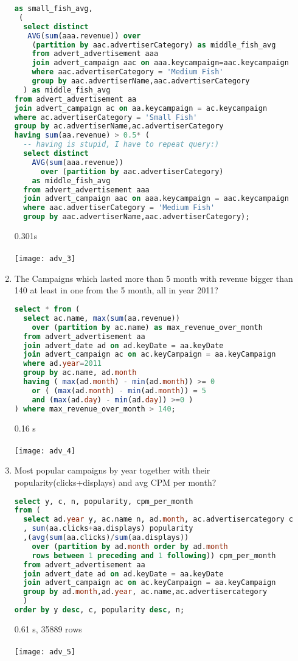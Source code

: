 \begin{enumerate}
\begin{lstlisting}[language=sql]
 as small_fish_avg,
 ( 
  select distinct
   AVG(sum(aaa.revenue)) over 
    (partition by aac.advertiserCategory) as middle_fish_avg
    from advert_advertisement aaa 
    join advert_campaign aac on aaa.keycampaign=aac.keycampaign
    where aac.advertiserCategory = 'Medium Fish'   
    group by aac.advertiserName,aac.advertiserCategory
  ) as middle_fish_avg
from advert_advertisement aa
join advert_campaign ac on aa.keycampaign = ac.keycampaign
where ac.advertiserCategory = 'Small Fish'
group by ac.advertiserName,ac.advertiserCategory
having sum(aa.revenue) > 0.5* (
  -- having is stupid, I have to repeat query:)
  select distinct
    AVG(sum(aaa.revenue)) 
      over (partition by aac.advertiserCategory) 
    as middle_fish_avg
  from advert_advertisement aaa 
  join advert_campaign aac on aaa.keycampaign = aac.keycampaign
  where aac.advertiserCategory = 'Medium Fish'   
  group by aac.advertiserName,aac.advertiserCategory);
  \end{lstlisting}
      0.301s\\ \\
      \texttt{[image: adv\_3]}
\item    The Campaigns which lasted more than 5 month with revenue bigger than 140 at least in one from the 5 month, all in year 2011?
  \begin{lstlisting}[language=sql] 
select * from (
  select ac.name, max(sum(aa.revenue)) 
    over (partition by ac.name) as max_revenue_over_month
  from advert_advertisement aa
  join advert_date ad on ad.keyDate = aa.keyDate
  join advert_campaign ac on ac.keyCampaign = aa.keyCampaign
  where ad.year=2011
  group by ac.name, ad.month
  having ( max(ad.month) - min(ad.month)) >= 0 
    or ( (max(ad.month) - min(ad.month)) = 5 
    and (max(ad.day) - min(ad.day)) >=0 )
) where max_revenue_over_month > 140;
  \end{lstlisting}
     0.16 s\\ \\
      \texttt{[image: adv\_4]}
\item Most popular campaigns by year together with their popularity(clicks+displays) and  avg CPM per month?
  \begin{lstlisting}[language=sql] 
select y, c, n, popularity, cpm_per_month
from (
  select ad.year y, ac.name n, ad.month, ac.advertisercategory c
  , sum(aa.clicks+aa.displays) popularity
  ,(avg(sum(aa.clicks)/sum(aa.displays)) 
    over (partition by ad.month order by ad.month 
    rows between 1 preceding and 1 following)) cpm_per_month
  from advert_advertisement aa
  join advert_date ad on ad.keyDate = aa.keyDate
  join advert_campaign ac on ac.keyCampaign = aa.keyCampaign
  group by ad.month,ad.year, ac.name,ac.advertisercategory
  )
order by y desc, c, popularity desc, n;
  \end{lstlisting}
     0.61 s, 35889 rows\\ \\
      \texttt{[image: adv\_5]}
\end{enumerate}



